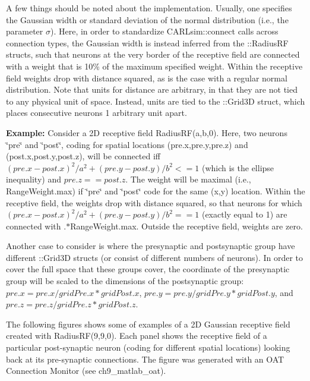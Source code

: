 A few things should be noted about the implementation. Usually, one specifies the Gaussian width or standard deviation of the normal distribution (i.\+e., the parameter $\sigma$). Here, in order to standardize C\+A\+R\+Lsim\+::connect calls across connection types, the Gaussian width is instead inferred from the \+::\+Radius\+RF structs, such that neurons at the very border of the receptive field are connected with a weight that is 10\% of the maximum specified weight. Within the receptive field weights drop with distance squared, as is the case with a regular normal distribution. Note that units for distance are arbitrary, in that they are not tied to any physical unit of space. Instead, units are tied to the \+::\+Grid3D struct, which places consecutive neurons 1 arbitrary unit apart.

{\bfseries Example\+:} Consider a 2D receptive field Radius\+R\+F(a,b,0). Here, two neurons \char`\"{}pre\char`\"{} and \char`\"{}post\char`\"{}, coding for spatial locations (pre.\+x,pre.\+y,pre.\+z) and (post.\+x,post.\+y,post.\+z), will be connected iff $ (pre.x-post.x)^2/a^2 + (pre.y-post.y)/b^2 <= 1 $ (which is the ellipse inequality) and $pre.z==post.z$. The weight will be maximal (i.\+e., {\ttfamily Range\+Weight.\+max}) if \char`\"{}pre\char`\"{} and \char`\"{}post\char`\"{} code for the same (x,y) location. Within the receptive field, the weights drop with distance squared, so that neurons for which $ (pre.x-post.x)^2/a^2 + (pre.y-post.y)/b^2 == 1$ (exactly equal to 1) are connected with {.$\ast$\+Range\+Weight.max}. Outside the receptive field, weights are zero.

Another case to consider is where the presynaptic and postsynaptic group have different \+::\+Grid3D structs (or consist of different numbers of neurons). In order to cover the full space that these groups cover, the coordinate of the presynaptic group will be scaled to the dimensions of the postsynaptic group\+: $ pre.x = pre.x / gridPre.x * gridPost.x $, $ pre.y = pre.y / gridPre.y * gridPost.y $, and $ pre.z = pre.z / gridPre.z * gridPost.z $.

The following figures shows some of examples of a 2D Gaussian receptive field created with Radius\+R\+F(9,9,0). Each panel shows the receptive field of a particular post-\/synaptic neuron (coding for different spatial locations) looking back at its pre-\/synaptic connections. The figure was generated with an O\+AT Connection Monitor (see ch9\+\_\+matlab\+\_\+oat).

